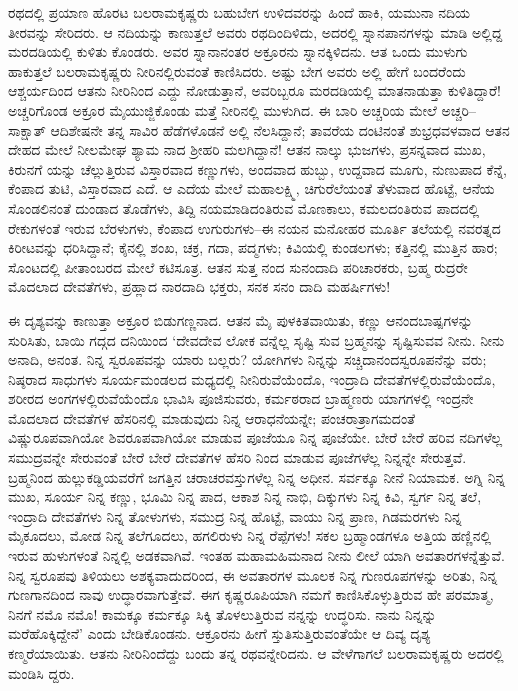 ರಥದಲ್ಲಿ ಪ್ರಯಾಣ ಹೊರಟ ಬಲರಾಮಕೃಷ್ಣರು ಬಹುಬೇಗ ಉಳಿದವರನ್ನು ಹಿಂದೆ ಹಾಕಿ, ಯಮುನಾ ನದಿಯ ತೀರವನ್ನು ಸೇರಿದರು. ಆ ನದಿಯನ್ನು ಕಾಣುತ್ತಲೆ ಅವರು ರಥದಿಂದಿಳಿದು, ಅದರಲ್ಲಿ ಸ್ನಾನಪಾನಗಳನ್ನು ಮಾಡಿ ಅಲ್ಲಿದ್ದ ಮರದಡಿಯಲ್ಲಿ ಕುಳಿತು ಕೊಂಡರು. ಅವರ ಸ್ನಾನಾನಂತರ ಅಕ್ರೂರನು ಸ್ನಾನಕ್ಕಿಳಿದನು. ಆತ ಒಂದು ಮುಳುಗು ಹಾಕುತ್ತಲೆ ಬಲರಾಮಕೃಷ್ಣರು ನೀರಿನಲ್ಲಿರುವಂತೆ ಕಾಣಿಸಿದರು. ಅಷ್ಟು ಬೇಗ ಅವರು ಅಲ್ಲಿ ಹೇಗೆ ಬಂದರೆಂದು ಆಶ್ಚರ್ಯದಿಂದ ಆತನು ನೀರಿನಿಂದ ಎದ್ದು ನೋಡುತ್ತಾನೆ, ಅವರಿಬ್ಬರೂ ಮರದಡಿಯಲ್ಲಿ ಮಾತನಾಡುತ್ತಾ ಕುಳಿತಿದ್ದಾರೆ! ಅಚ್ಚರಿಗೊಂಡ ಅಕ್ರೂರ ಮೈಯುಜ್ಜಿಕೊಂಡು ಮತ್ತೆ ನೀರಿನಲ್ಲಿ ಮುಳುಗಿದ. ಈ ಬಾರಿ ಅಚ್ಚರಿಯ ಮೇಲೆ ಅಚ್ಚರಿ–ಸಾಕ್ಷಾತ್ ಆದಿಶೇಷನೇ ತನ್ನ ಸಾವಿರ ಹೆಡೆಗಳೊಡನೆ ಅಲ್ಲಿ ನೆಲಸಿದ್ದಾನೆ; ತಾವರೆಯ ದಂಟಿನಂತೆ ಶುಭ್ರಧವಳವಾದ ಆತನ ದೇಹದ ಮೇಲೆ ನೀಲಮೇಘ ಶ್ಯಾಮ ನಾದ ಶ್ರೀಹರಿ ಮಲಗಿದ್ದಾನೆ! ಆತನ ನಾಲ್ಕು ಭುಜಗಳು, ಪ್ರಸನ್ನವಾದ ಮುಖ, ಕಿರುನಗೆ ಯನ್ನು ಚೆಲ್ಲುತ್ತಿರುವ ವಿಸ್ತಾರವಾದ ಕಣ್ಣುಗಳು, ಅಂದವಾದ ಹುಬ್ಬು, ಉದ್ದವಾದ ಮೂಗು, ನುಣುಪಾದ ಕೆನ್ನೆ, ಕೆಂಪಾದ ತುಟಿ, ವಿಸ್ತಾರವಾದ ಎದೆ. ಆ ಎದೆಯ ಮೇಲೆ ಮಹಾಲಕ್ಷ್ಮಿ, ಚಿಗುರೆಲೆಯಂತೆ ತೆಳುವಾದ ಹೊಟ್ಟೆ, ಆನೆಯ ಸೊಂಡಲಿನಂತೆ ದುಂಡಾದ ತೊಡೆಗಳು, ತಿದ್ದಿ ನಯಮಾಡಿದಂತಿರುವ ಮೊಣಕಾಲು, ಕಮಲದಂತಿರುವ ಪಾದದಲ್ಲಿ ರೇಕುಗಳಂತೆ ಇರುವ ಬೆರಳುಗಳು, ಕೆಂಪಾದ ಉಗುರುಗಳು–ಈ ನಯನ ಮನೋಹರ ಮೂರ್ತಿ ತಲೆಯಲ್ಲಿ ನವರತ್ನದ ಕಿರೀಟವನ್ನು ಧರಿಸಿದ್ದಾನೆ; ಕೈನಲ್ಲಿ ಶಂಖ, ಚಕ್ರ, ಗದಾ, ಪದ್ಮಗಳು; ಕಿವಿಯಲ್ಲಿ ಕುಂಡಲಗಳು; ಕತ್ತಿನಲ್ಲಿ ಮುತ್ತಿನ ಹಾರ; ಸೊಂಟದಲ್ಲಿ ಪೀತಾಂಬರದ ಮೇಲೆ ಕಟಿಸೂತ್ರ. ಆತನ ಸುತ್ತ ನಂದ ಸುನಂದಾದಿ ಪರಿಚಾರಕರು, ಬ್ರಹ್ಮ ರುದ್ರರೇ ಮೊದಲಾದ ದೇವತೆಗಳು, ಪ್ರಹ್ಲಾದ ನಾರದಾದಿ ಭಕ್ತರು, ಸನಕ ಸನಂ ದಾದಿ ಮಹರ್ಷಿಗಳು!

ಈ ದೃಶ್ಯವನ್ನು ಕಾಣುತ್ತಾ ಅಕ್ರೂರ ಬಿಡುಗಣ್ಣನಾದ. ಆತನ ಮೈ ಪುಳಕಿತವಾಯಿತು, ಕಣ್ಣು ಆನಂದಬಾಷ್ಪಗಳನ್ನು ಸುರಿಸಿತು, ಬಾಯಿ ಗದ್ಗದ ದನಿಯಿಂದ ‘ದೇವದೇವ ಲೋಕ ವನ್ನೆಲ್ಲ ಸೃಷ್ಟಿ ಸುವ ಬ್ರಹ್ಮನನ್ನು ಸೃಷ್ಟಿಸುವವ ನೀನು. ನೀನು ಅನಾದಿ, ಅನಂತ. ನಿನ್ನ ಸ್ವರೂಪವನ್ನು ಯಾರು ಬಲ್ಲರು? ಯೋಗಿಗಳು ನಿನ್ನನ್ನು ಸಚ್ಚಿದಾನಂದಸ್ವರೂಪನೆನ್ನು ವರು; ನಿಷ್ಠರಾದ ಸಾಧುಗಳು ಸೂರ್ಯಮಂಡಲದ ಮಧ್ಯದಲ್ಲಿ ನೀನಿರುವೆಯೆಂದೊ, ಇಂದ್ರಾದಿ ದೇವತೆಗಳಲ್ಲಿರುವೆಯೆಂದೊ, ಶರೀರದ ಅಂಗಗಳಲ್ಲಿರುವೆಯೆಂದೊ ಭಾವಿಸಿ ಪೂಜಿಸುವರು, ಕರ್ಮಠರಾದ ಬ್ರಾಹ್ಮಣರು ಯಾಗಗಳಲ್ಲಿ ಇಂದ್ರನೇ ಮೊದಲಾದ ದೇವತೆಗಳ ಹೆಸರಿನಲ್ಲಿ ಮಾಡುವುದು ನಿನ್ನ ಆರಾಧನೆಯನ್ನೇ; ಪಂಚರಾತ್ರಾಗಮದಂತೆ ವಿಷ್ಣುರೂಪವಾಗಿಯೋ ಶಿವರೂಪವಾಗಿಯೋ ಮಾಡುವ ಪೂಜೆಯೂ ನಿನ್ನ ಪೂಜೆಯೇ. ಬೇರೆ ಬೇರೆ ಹರಿವ ನದಿಗಳೆಲ್ಲ ಸಮುದ್ರವನ್ನೇ ಸೇರುವಂತೆ ಬೇರೆ ಬೇರೆ ದೇವತೆಗಳ ಹೆಸರಿ ನಿಂದ ಮಾಡುವ ಪೂಜೆಗಳೆಲ್ಲ ನಿನ್ನನ್ನೇ ಸೇರುತ್ತವೆ. ಬ್ರಹ್ಮನಿಂದ ಹುಲ್ಲುಕಡ್ಡಿಯವರೆಗೆ ಜಗತ್ತಿನ ಚರಾಚರವಸ್ತುಗಳೆಲ್ಲ ನಿನ್ನ ಅಧೀನ. ಸರ್ವಕ್ಕೂ ನೀನೆ ನಿಯಾಮಕ. ಅಗ್ನಿ ನಿನ್ನ ಮುಖ, ಸೂರ್ಯ ನಿನ್ನ ಕಣ್ಣು, ಭೂಮಿ ನಿನ್ನ ಪಾದ, ಆಕಾಶ ನಿನ್ನ ನಾಭಿ, ದಿಕ್ಕುಗಳು ನಿನ್ನ ಕಿವಿ, ಸ್ವರ್ಗ ನಿನ್ನ ತಲೆ, ಇಂದ್ರಾದಿ ದೇವತೆಗಳು ನಿನ್ನ ತೋಳುಗಳು, ಸಮುದ್ರ ನಿನ್ನ ಹೊಟ್ಟೆ, ವಾಯು ನಿನ್ನ ಪ್ರಾಣ, ಗಿಡಮರಗಳು ನಿನ್ನ ಮೈಕೂದಲು, ಮೋಡ ನಿನ್ನ ತಲೆಗೂದಲು, ಹಗಲಿರುಳು ನಿನ್ನ ರೆಪ್ಪೆಗಳು! ಸಕಲ ಬ್ರಹ್ಮಾಂಡಗಳೂ ಅತ್ತಿಯ ಹಣ್ಣಿನಲ್ಲಿ ಇರುವ ಹುಳುಗಳಂತೆ ನಿನ್ನಲ್ಲಿ ಅಡಕವಾಗಿವೆ. ಇಂತಹ ಮಹಾಮಹಿಮನಾದ ನೀನು ಲೀಲೆ ಯಾಗಿ ಅವತಾರಗಳನ್ನೆತ್ತುವೆ. ನಿನ್ನ ಸ್ವರೂಪವು ತಿಳಿಯಲು ಅಶಕ್ಯವಾದುದರಿಂದ, ಈ ಅವತಾರಗಳ ಮೂಲಕ ನಿನ್ನ ಗುಣರೂಪಗಳನ್ನು ಅರಿತು, ನಿನ್ನ ಗುಣಗಾನದಿಂದ ನಾವು ಉದ್ಧಾರವಾಗುತ್ತೇವೆ. ಈಗ ಕೃಷ್ಣರೂಪಿಯಾಗಿ ನಮಗೆ ಕಾಣಿಸಿಕೊಳ್ಳುತ್ತಿರುವ ಹೇ ಪರಮಾತ್ಮ, ನಿನಗೆ ನಮೊ ನಮೊ! ಕಾಮಕ್ಕೂ ಕರ್ಮಕ್ಕೂ ಸಿಕ್ಕಿ ತೊಳಲುತ್ತಿರುವ ನನ್ನನ್ನು ಉದ್ಧರಿಸು. ನಾನು ನಿನ್ನನ್ನು ಮರೆಹೊಕ್ಕಿದ್ದೇನೆ’ ಎಂದು ಬೇಡಿಕೊಂಡನು. ಆಕ್ರೂರನು ಹೀಗೆ ಸ್ತುತಿಸುತ್ತಿರುವಂತೆಯೇ ಆ ದಿವ್ಯ ದೃಶ್ಯ ಕಣ್ಮರೆಯಾಯಿತು. ಆತನು ನೀರಿನಿಂದೆದ್ದು ಬಂದು ತನ್ನ ರಥವನ್ನೇರಿದನು. ಆ ವೇಳೆಗಾಗಲೆ ಬಲರಾಮಕೃಷ್ಣರು ಅದರಲ್ಲಿ ಮಂಡಿಸಿ ದ್ದರು.


